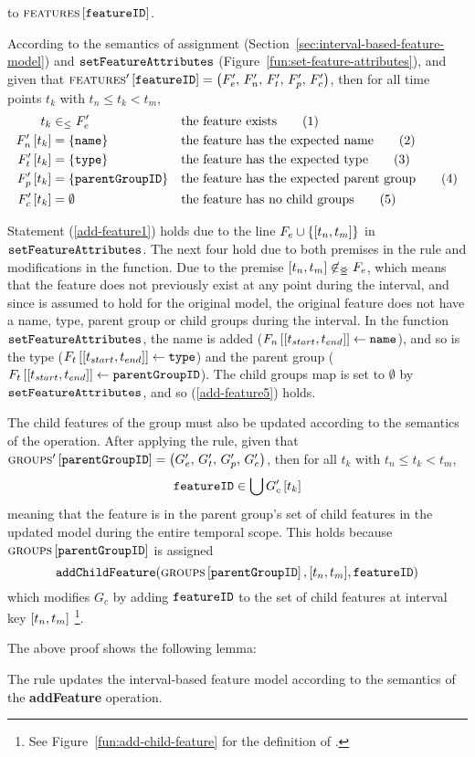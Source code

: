 to $\textsc{features} \left[ \texttt{featureID} \right]$. 

According to the semantics of assignment (Section~\vref{sec:interval-based-feature-model}) and $\texttt{setFeatureAttributes}$ (Figure~\vref{fun:set-feature-attributes}), and given that $\textsc{features}' \left[ \texttt{featureID} \right] = \left(F'_e,\, F'_n,\, F'_t,\, F'_p,\, F'_c\right)$, then for all time points $t_k$ with $t_n \leq t_k < t_m$,
\begin{align}
   t_k &\in_\leq F'_e && \text{the feature exists} \tag{1} \label{add-feature1}\\
   F'_n \left[ t_k \right] &= \left\{\texttt{name}\right\} && \text{the feature has the expected name} \tag{2} \label{add-feature2}\\
   F'_t \left[ t_k \right] &= \left\{\texttt{type}\right\}  && \text{the feature has the expected type} \tag{3} \label{add-feature3}\\
   F'_p \left[ t_k \right] &= \left\{\texttt{parentGroupID}\right\}  && \text{the feature has the expected parent group} \tag{4} \label{add-feature4}\\
   F'_c \left[ t_k \right] &= \emptyset && \text{the feature has no child groups} \tag{5} \label{add-feature5}
\end{align}

Statement (\ref{add-feature1}) holds due to the line $F_e \cup \set{\interval{t_n}{t_m}}$ in $\texttt{setFeatureAttributes}$. The next four hold due to both premises in the rule and modifications in the function. Due to the premise $\interval{t_n}{t_m} \not \innr F_e$, which means that the feature does not previously exist at any point during the interval, and since  is assumed to hold for the original model, the original feature does not have a name, type, parent group or child groups during the interval. In the function $\texttt{setFeatureAttributes}$, the name is added ($\lookup{F_n}{\interval{t_{start}}{t_{end}}} \assign \var{name}$), and so is the type ($\lookup{F_t}{\interval{t_{start}}{t_{end}}} \assign \var{type}$) and the parent group ($\lookup{F_t}{\interval{t_{start}}{t_{end}}} \assign \var{parentGroupID}$). The child groups map is set to $\emptyset$ by $\texttt{setFeatureAttributes}$, and so (\ref{add-feature5}) holds.

The child features of the group must also be updated according to the semantics of the operation. After applying the rule, given that $\textsc{groups}{}' \left[ \texttt{parentGroupID} \right] = \left(G'_e,\, G'_t,\, G'_p,\, G'_c\right)$, then for all $t_k$ with $t_n \leq t_k < t_m$,
\[
   \texttt{featureID} \in \bigcup G'_c \left[ t_k \right]
\]
meaning that the feature is in the parent group's set of child features in the updated model during the entire temporal scope. This holds because $\textsc{groups}{} \left[ \texttt{parentGroupID} \right]$ is assigned 
$$\var{addChildFeature}(\lookup{\groups}{\var{parentGroupID}}, \interval{t_n}{t_m}, \var{featureID})$$ 
which modifies $G_c$ by adding $\texttt{featureID}$ to the set of child features at interval key $\interval{t_n}{t_m}$ \footnote{See Figure~\vref{fun:add-child-feature} for the definition of .}.

The above proof shows the following lemma:
\\

\begin{lemma}
   The  rule updates the interval-based feature model according to the semantics of the \textbf{addFeature} operation.
   \label{lemma:add-feature-mod}
\end{lemma}

